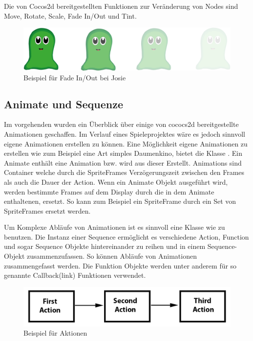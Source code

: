 Die von Cocos2d bereitgestellten Funktionen zur Veränderung von Nodes sind Move, Rotate, Scale, Fade In/Out und Tint.

\begin{figure}[H]
 \centering
  \includegraphics[width=12\textwidth]{resources/josiedoku5}
  \caption{Beispiel für Fade In/Out bei Josie}
  \label{fig:fade} 
\end{figure}


\subsection{Animate und Sequenze}
Im vorgehenden wurden ein Überblick über einige von cococs2d bereitgestellte Animationen geschaffen. Im Verlauf eines Spieleprojektes wäre es jedoch sinnvoll eigene Animationen erstellen zu können. Eine Möglichkeit eigene Animationen zu erstellen wie zum Beispiel eine Art simples Daumenkino, bietet die Klasse . Ein Animate enthält eine Animation bzw. wird aus dieser Erstellt. Animations sind Container welche durch die SpriteFrames Verzögerungszeit zwischen den Frames als auch die Dauer der Action. Wenn ein Animate Objekt ausgeführt wird, werden bestimmte Frames auf dem Display durch die in dem Animate enthaltenen, ersetzt. So kann zum Beispiel ein SpriteFrame durch ein Set von SpriteFrames ersetzt werden.

Um Komplexe Abläufe von Animationen ist es sinnvoll eine Klasse wie  zu benutzen. Die Instanz einer Sequence ermöglicht es verschiedene Action, Function und sogar Sequence Objekte hintereinander zu reihen und in einem Sequence-Objekt zusammenzufassen. So können Abläufe von Animationen zusammengefasst werden. 
Die Funktion Objekte werden unter anderem für so genannte Callback(link) Funktionen verwendet. 

\begin{figure}[H]
 \centering
  \includegraphics[width=12\textwidth]{resources/sequence}
  \caption{Beispiel für Aktionen}
  \label{fig:sequence} 
\end{figure}



